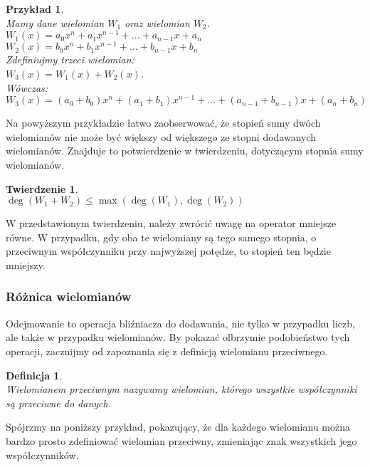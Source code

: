 \documentclass[oneside,a4paper]{book}
\newtheorem{theorem}{Twierdzenie}
\newtheorem{definition}{Definicja}
\newtheorem{example}{Przykład}
\begin{document}
	\begin{example}
		$ $\\
		Mamy dane wielomian $W_1$ oraz wielomian $W_2$. \\
		$W_1(x) = a_0x^n + a_1x^{n-1} + ... + a_{n-1}x + a_n$ \\
		$W_2(x) = b_0x^n + b_1x^{n-1} + ... + b_{n-1}x + b_n$ \\
		Zdefiniujmy trzeci wielomian: \\
		$W_3(x) = W_1(x) + W_2(x)$. \\
		Wówczas: \\
		$W_3(x) = (a_0+b_0)x^n + (a_1+b_1)x^{n-1} + ... + (a_{n-1} + b_{n-1})x + (a_n + b_n)$ \\
	\end{example}
	
	Na powyższym przykładzie łatwo zaobserwować, że stopień sumy dwóch wielomianów nie może być większy od większego ze stopni dodawanych wielomianów. Znajduje to potwierdzenie w twierdzeniu, dotyczącym stopnia sumy wielomianów.
	
	\begin{theorem}
		$ $\\
		$\deg(W_1 + W_2) \le \max(\deg(W_1),\deg (W_2))$
	\end{theorem}
	
	W przedstawionym twierdzeniu, należy zwrócić uwagę na operator mniejsze równe. W przypadku, gdy oba te wielomiany są tego samego stopnia, o przeciwnym współczynniku przy najwyższej potędze, to stopień ten będzie mniejszy.
	
	\subsubsection{Różnica wielomianów}
	
	Odejmowanie to operacja bliźniacza do dodawania, nie tylko w przypadku liczb, ale także w przypadku wielomianów. By pokazać olbrzymie podobieństwo tych operacji, zacznijmy od zapoznania się z definicją wielomianu przeciwnego.
	
	\begin{definition}
		$ $\\
		Wielomianem przeciwnym nazywamy wielomian, którego wszystkie współczynniki są przeciwne do danych.
	\end{definition}
	
	Spójrzmy na poniższy przykład, pokazujący, że dla każdego wielomianu można bardzo prosto zdefiniować wielomian przeciwny, zmieniając znak wszystkich jego współczynników.
	
\end{document}
